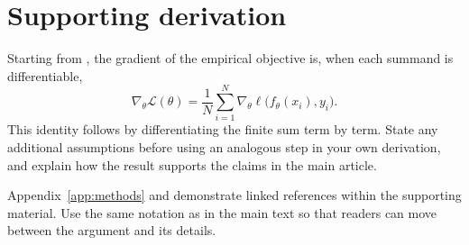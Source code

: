 \section{Supporting derivation}
\label{app:derivation}
Starting from , the gradient of the empirical objective
is, when each summand is differentiable,
\begin{equation}
  \nabla_{\theta}\mathcal{L}(\theta)
  =\frac{1}{N}\sum_{i=1}^{N}
  \nabla_{\theta}\ell\bigl(f_{\theta}(x_i),y_i\bigr).
  \label{eq:supplement-gradient}
\end{equation}
This identity follows by differentiating the finite sum term by term. State any
additional assumptions before using an analogous step in your own derivation,
and explain how the result supports the claims in the main article.

Appendix~\ref{app:methods} and  demonstrate
linked references within the supporting material. Use the same notation as in
the main text so that readers can move between the argument and its details.
